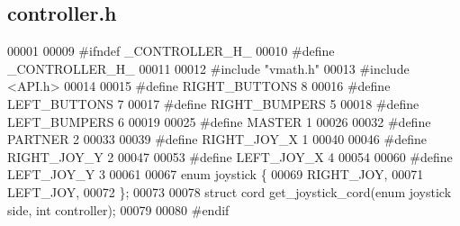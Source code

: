 \subsection{controller.\+h}
\label{controller_8h_source}

\begin{DoxyCode}
00001 
00009 \textcolor{preprocessor}{#ifndef \_CONTROLLER\_H\_}
00010 \textcolor{preprocessor}{#define \_CONTROLLER\_H\_}
00011 
00012 \textcolor{preprocessor}{#include "vmath.h"}
00013 \textcolor{preprocessor}{#include <API.h>}
00014 
00015 \textcolor{preprocessor}{#define RIGHT\_BUTTONS 8}
00016 \textcolor{preprocessor}{#define LEFT\_BUTTONS 7}
00017 \textcolor{preprocessor}{#define RIGHT\_BUMPERS 5}
00018 \textcolor{preprocessor}{#define LEFT\_BUMPERS 6}
00019 
00025 \textcolor{preprocessor}{#define MASTER 1}
00026 
00032 \textcolor{preprocessor}{#define PARTNER 2}
00033 
00039 \textcolor{preprocessor}{#define RIGHT\_JOY\_X 1}
00040 
00046 \textcolor{preprocessor}{#define RIGHT\_JOY\_Y 2}
00047 
00053 \textcolor{preprocessor}{#define LEFT\_JOY\_X 4}
00054 
00060 \textcolor{preprocessor}{#define LEFT\_JOY\_Y 3}
00061 
00067 \textcolor{keyword}{enum} joystick \{
00069   RIGHT_JOY,
00071   LEFT_JOY,
00072 \};
00073 
00078 \textcolor{keyword}{struct }cord get_joystick_cord(enum joystick side, int controller);
00079 
00080 \textcolor{preprocessor}{#endif}
\end{DoxyCode}
